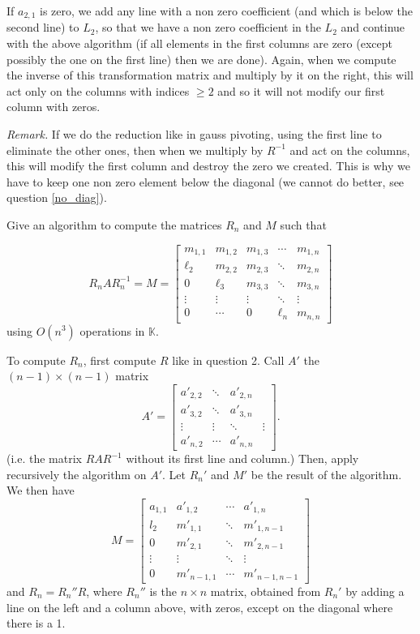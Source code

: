 \documentclass[11pt]{exam}
\theoremstyle{definition}
\begin{document}
{\begin{questions}
\begin{solution}
		If $a_{2,1}$ is zero, we add any line with a non zero coefficient (and which is below the second line) to $L_2$, so that we have a non zero coefficient in the $L_2$ and continue with the above algorithm (if all elements in the first columns are zero (except possibly the one on the first line) then we are done). Again, when we compute the inverse of this transformation matrix and multiply by it on the right, this will act only on the columns with indices $\geq 2$ and so it will not modify our first column with zeros.
		
		\textit{Remark.} If we do the reduction like in gauss pivoting, using the first line to eliminate the other ones, then when we multiply by $R^{-1}$ and act on the columns, this will modify the first column and destroy the zero we created. This is why we have to keep one non zero element below the diagonal (we cannot do better, see question \ref{no_diag}).
		
	\end{solution}
	
	
	\question Give an algorithm to compute the matrices $R_n$ and $M$ such that
	
	\[
	R_nAR_n^{-1}=M=\begin{bmatrix}
	m_{1,1} & m_{1,2} & m_{1,3} & \cdots & m_{1,n} \\
	\ell_2 & m_{2,2} & m_{2,3} & \ddots & m_{2,n} \\
	0 & \ell_3 & m_{3,3} & \ddots & m_{3,n} \\
	\vdots & \vdots & \vdots & \ddots & \vdots \\
	0 & \cdots & 0 & \ell_n & m_{n,n}
	\end{bmatrix}
	\]
	using $O(n^3)$ operations in $\mathbb{K}$.
	
	
	\begin{solution}
		To compute $R_n$, first compute $R$ like in question 2. Call $A'$ the $(n-1) \times (n-1)$ matrix 
		$$ A' 
		=\begin{bmatrix}
		a'_{2,2} & \ddots & a'_{2,n} \\
		a'_{3,2} & \ddots & a'_{3,n} \\
		\vdots & \vdots & \ddots & \vdots \\
		a'_{n,2} & \cdots & a'_{n,n}
		\end{bmatrix}. $$
		(i.e. the matrix $RAR^{-1}$ without its first line and column.)
		Then, apply recursively the algorithm on $A'$. Let $R_n'$ and $M'$ be the result of the algorithm. We then have
		$$ M
		= \begin{bmatrix}
		a_{1,1} & a'_{1,2} & \cdots & a'_{1,n} \\
		l_2 & m'_{1,1} & \ddots & m'_{1,n-1} \\
		0 & m'_{2,1} & \ddots & m'_{2,n-1} \\
		\vdots & \vdots & \ddots & \vdots \\
		0 & m'_{n-1,1} & \cdots & m'_{n-1,n-1}
		\end{bmatrix}$$
		and
		$R_n = R_n'' R$, where $R_n''$ is the $n \times n$ matrix, obtained from $R_n'$ by adding a line on the left and a column above, with zeros, except on the diagonal where there is a 1.
		

\end{solution}
\end{questions}}
\end{document}
